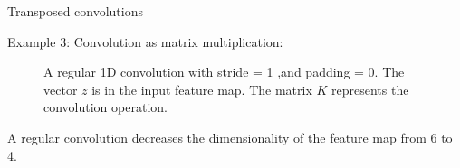 \begin{vbframe}{Transposed convolutions}
\framebreak 

Example 3: Convolution as matrix multiplication:
\begin{figure}
\centering
{}
\caption{A regular 1D convolution with  stride = 1 ,and padding = 0. The vector $z$ is in the input feature map. The matrix $K$ represents the convolution operation.}
\end{figure}
  A regular convolution decreases the dimensionality of the feature map from 6 to 4.\\
\end{vbframe}

